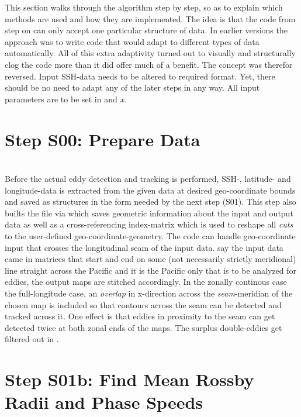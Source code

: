 \label{chap:algorithm}	

This section walks through the algorithm step by step, so as to explain
which
methods are used and how they are implemented.
The idea is that the code from step  on can only accept one particular structure of data. In earlier versions the approach was to write code
that would adapt to different types of data automatically. All of this extra
adaptivity turned out to visually and structurally clog the code more than it
did offer much of a benefit. The concept was therefor reversed. Input SSH-data needs to be altered to required format. Yet, there should be no need to adapt any of the later steps in any way.
All input parameters are to be set in  and \textit{x}.

\section{Step S00: Prepare Data}
	\\
Before the actual eddy detection and tracking is performed,  SSH-, latitude- and longitude-data is extracted from the given data at desired geo-coordinate bounds and saved as structures in the form needed by the next step (S01). This step also builts the file  via  which saves geometric information about the input and output data as well as a cross-referencing index-matrix which is used to reshape all \textit{cuts} to the user-defined geo-coordinate-geometry. The code can handle geo-coordinate input that crosses the longitudinal seam of
the input data. \Eg say the input data came in matrices that start and end on
some (not necessarily strictly meridional) line straight across the Pacific and
it is the Pacific only that is to be analyzed for eddies, the output maps are
stitched accordingly. In the zonally continous case \ie the full-longitude case, an \textit{overlap} in x-direction across the \textit{seam}-meridian of the chosen map is included so that contours across the seam can be detected and tracked across it. One effect is that eddies in proximity to the seam can get detected twice at both zonal ends of the maps. The surplus double-eddies get filtered out in .
\section{Step S01b: Find Mean Rossby Radii and Phase Speeds}
\\

